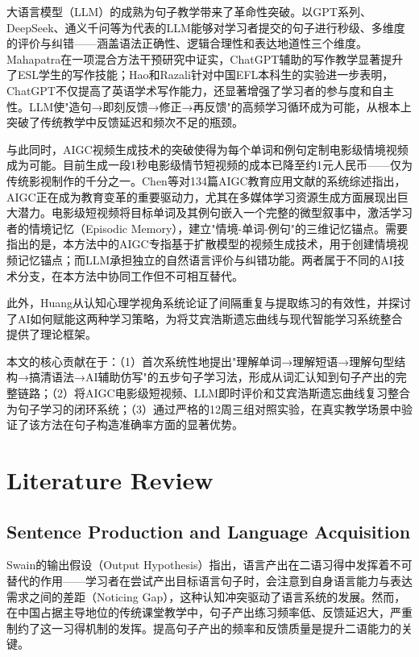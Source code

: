 \documentclass[Afour,sageapa,times]{sagej}
\begin{document}
大语言模型（LLM）的成熟为句子教学带来了革命性突破。以GPT系列、DeepSeek、通义千问等为代表的LLM能够对学习者提交的句子进行秒级、多维度的评价与纠错——涵盖语法正确性、逻辑合理性和表达地道性三个维度。Mahapatra\cite{mahapatra2024impact}在一项混合方法干预研究中证实，ChatGPT辅助的写作教学显著提升了ESL学生的写作技能；Hao和Razali\cite{hongxia2025impact}针对中国EFL本科生的实验进一步表明，ChatGPT不仅提高了英语学术写作能力，还显著增强了学习者的参与度和自主性。LLM使"造句→即刻反馈→修正→再反馈"的高频学习循环成为可能，从根本上突破了传统教学中反馈延迟和频次不足的瓶颈。

与此同时，AIGC视频生成技术的突破使得为每个单词和例句定制电影级情境视频成为可能。目前生成一段1秒电影级情节短视频的成本已降至约1元人民币——仅为传统影视制作的千分之一。Chen等\cite{chen2024empowering}对134篇AIGC教育应用文献的系统综述指出，AIGC正在成为教育变革的重要驱动力，尤其在多媒体学习资源生成方面展现出巨大潜力。电影级短视频将目标单词及其例句嵌入一个完整的微型叙事中，激活学习者的情境记忆（Episodic Memory），建立"情境-单词-例句"的三维记忆锚点。需要指出的是，本方法中的AIGC专指基于扩散模型的视频生成技术，用于创建情境视频记忆锚点；而LLM承担独立的自然语言评价与纠错功能。两者属于不同的AI技术分支，在本方法中协同工作但不可相互替代。

此外，Huang\cite{huang2025spaced}从认知心理学视角系统论证了间隔重复与提取练习的有效性，并探讨了AI如何赋能这两种学习策略，为将艾宾浩斯遗忘曲线与现代智能学习系统整合提供了理论框架。

本文的核心贡献在于：（1）首次系统性地提出"理解单词→理解短语→理解句型结构→搞清语法→AI辅助仿写"的五步句子学习法，形成从词汇认知到句子产出的完整链路；（2）将AIGC电影级短视频、LLM即时评价和艾宾浩斯遗忘曲线复习整合为句子学习的闭环系统；（3）通过严格的12周三组对照实验，在真实教学场景中验证了该方法在句子构造准确率方面的显著优势。


\section{Literature Review}  %

\subsection{Sentence Production and Language Acquisition}

Swain的输出假设（Output Hypothesis）指出，语言产出在二语习得中发挥着不可替代的作用——学习者在尝试产出目标语言句子时，会注意到自身语言能力与表达需求之间的差距（Noticing Gap），这种认知冲突驱动了语言系统的发展\cite{swain1995three}。然而，在中国占据主导地位的传统课堂教学中，句子产出练习频率低、反馈延迟大，严重制约了这一习得机制的发挥。提高句子产出的频率和反馈质量是提升二语能力的关键。
\end{document}
